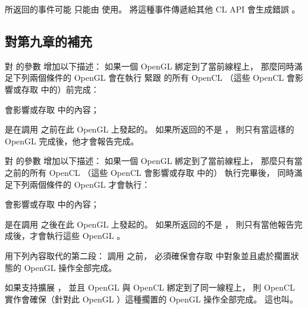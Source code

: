  所返回的事件可能
只能由  使用。
將這種事件傳遞給其他 CL API 會生成錯誤 。
\stopreplacepar %

\subsection{對第九章的補充}

對  的參數  增加以下描述：
\startreplacepar
如果一個 OpenGL 綁定到了當前線程上，
那麼同時滿足下列兩個條件的 OpenGL 會在執行
緊跟  的所有 OpenCL 
（這些 OpenCL 會影響或存取  中的）前完成：
\startigNum[indentnext=no]
\item 會影響或存取  中的內容；
\item 是在調用  之前在此 OpenGL 上發起的。
\stopigNum
如果所返回的不是 ，
則只有當這樣的 OpenGL 完成後，他才會報告完成。
\stopreplacepar

對  的參數  增加以下描述：
\startreplacepar
如果一個 OpenGL 綁定到了當前線程上，
那麼只有當  之前的所有 OpenCL 
（這些 OpenCL 會影響或存取  中的）
執行完畢後，
同時滿足下列兩個條件的 OpenGL 才會執行：
\startigNum[indentnext=no]
\item 會影響或存取  中的內容；
\item 是在調用  之後在此 OpenGL 上發起的。
\stopigNum
如果所返回的不是 ，
則只有當他報告完成後，才會執行這些 OpenGL 。
\stopreplacepar

用下列內容取代\insection[syncCLGL]的第二段：
\startreplacepar
調用  之前，
必須確保會存取  中對象並且處於擱置狀態的 OpenGL 操作全部完成。

如果支持擴展 ，
並且 OpenGL 與 OpenCL 綁定到了同一線程上，
則 OpenCL 實作會確保（針對此 OpenGL ）這種擱置的 OpenGL 操作全部完成。
這也叫{}。

